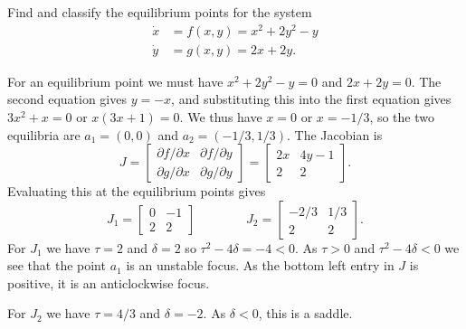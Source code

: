\documentclass[a4paper]{amsart}
\begin{document}
\begin{exercise}\label{ex-misc-c}
 Find and classify the equilibrium points for the system
 \begin{align*}
  \dot{x} &= f(x,y) = x^2+2y^2-y \\
  \dot{y} &= g(x,y) = 2x+2y.
 \end{align*}
\end{exercise}
\begin{solution}
 For an equilibrium point we must have $x^2+2y^2-y=0$ and $2x+2y=0$.
 The second equation gives $y=-x$, and substituting this into the
 first equation gives $3x^2+x=0$ or $x(3x+1)=0$.  We thus have $x=0$
 or $x=-1/3$, so the two equilibria are $a_1=(0,0)$ and
 $a_2=(-1/3,1/3)$.  The Jacobian is 
 \[ J = \left[\begin{array}{cc} \partial f/\partial x & \partial f/\partial y \\
             \partial g/\partial x & \partial g/\partial y \end{array}\right]
      = \left[\begin{array}{cc} 2x & 4y-1 \\ 2 & 2 \end{array}\right].
 \]
 Evaluating this at the equilibrium points gives
 \[ J_1 = \left[\begin{array}{cc} 0 & -1 \\ 2 & 2 \end{array}\right] \hspace{4em}
    J_2 = \left[\begin{array}{cc} -2/3 & 1/3 \\ 2 & 2 \end{array}\right].
 \]
 For $J_1$ we have $\tau=2$ and $\delta=2$ so $\tau^2-4\delta=-4<0$.  As
 $\tau>0$ and $\tau^2-4\delta<0$ we see that the point $a_1$ is an
 unstable focus.  As the bottom left entry in $J$ is positive, it is an
 anticlockwise focus.  

 For $J_2$ we have $\tau=4/3$ and $\delta=-2$.  As $\delta<0$, this is a
 saddle.    


\end{solution}
\end{document}
